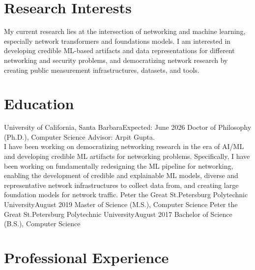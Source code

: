 \documentclass{scv}
\begin{document}

\section{Research Interests}
    \justifying
    My current research lies at the intersection of networking and machine learning, especially network transformers and foundations models. 
    I am interested in developing credible ML-based artifacts and data representations for different networking and security problems, and democratizing network research by creating public measurement infrastructures, datasets, and tools.

\section{Education}
  \resumeSubHeadingListStart
    \resumeSubheadingWithText
      {University of California, Santa Barbara}{Expected: June 2026}
      {Doctor of Philosophy (Ph.D.), Computer Science}{}
      {Advisor: Arpit Gupta.\\
        I have been working on democratizing networking research in the era of AI/ML and developing credible ML artifacts for networking problems.%
        Specifically, I have been working on fundamentally redesigning the ML pipeline for networking, enabling the development of credible and explainable ML models, diverse and representative network infrastructures to collect data from, and %
        creating large foundation models for network traffic.}{}
    \resumeSubheading
      {Peter the Great St.Petersburg Polytechnic University}{August 2019}
      {Master of Science (M.S.), Computer Science}{}
    \resumeSubheading
      {Peter the Great St.Petersburg Polytechnic University}{August 2017}
      {Bachelor of Science (B.S.), Computer Science}{}
  \resumeSubHeadingListEnd
    
\section{Professional Experience}
  \resumeSubHeadingListStart
\end{document}
